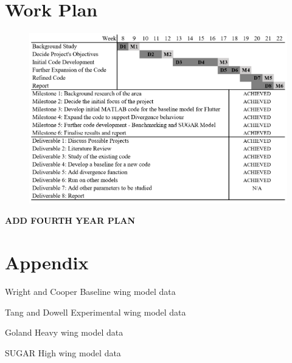 \documentclass[11pt]{article}
\begin{document}
\section{Work Plan}
\begin{figure}[H]
    \centering
    \includegraphics[width = .9\textwidth]{figures/dandm.png}
\end{figure}

\textbf{ADD FOURTH YEAR PLAN}
\cleardoublepage

\newpage


\section*{Appendix}
\begin{table}[H]
    \centering
    \caption{Wright and Cooper Baseline wing model data \cite{Wright2015INTRODUCTIONLOADS}}
    
    \label{tab:JandJ-wing-data}
\end{table}
\begin{table}[H]
    \centering
    \caption{Tang and Dowell Experimental wing model data \cite{Tang2001ExperimentalWings}}
    
    \label{tab:TandD-exp-wing-data}
\end{table}
\begin{table}[H]
    \centering
    \caption{Goland Heavy wing model data \cite{CHETANNICHKAWDE2006NONLINEARCONTINUATION}}
    
    \label{tab:Goland-wing-data}
\end{table}
\begin{table}[H]
    \centering
    \caption{SUGAR High wing model data \cite{Bradley2015SubsonicExploration}}
    
    \label{tab:SUGAR-wing-data}
\end{table}
\end{document}
